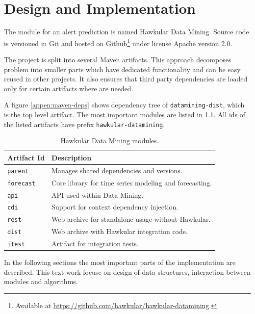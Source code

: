 \chapter{Design and Implementation} \label{chap:design-im[pl}
The module for an alert prediction is named Hawkular Data Mining. Source code is versioned in Git and
hosted on Github\footnote{Available at \url{https://github.com/hawkular/hawkular-datamining}.} under
license Apache version 2.0.

The project is split into several Maven artifacts. This approach decomposes problem into smaller parts
which have dedicated functionality and can be easy reused in other projects. It also ensures that
third party dependencies are loaded only for certain artifacts where are needed.

A figure \ref{appen:maven-deps} shows dependency tree of \texttt{datamining-dist}, which is the top level artifact.
The most important modules are listed in \ref{tab:datamining-modules}. All ids of the listed artifacts have prefix
\texttt{hawkular-datamining}.

\begin{table}[h]
    \begin{center}
        \begin{tabular}{l|l}
            \textbf{Artifact Id} & \textbf{Description} \\ \hline \hline
            \texttt{parent} & Manages shared dependencies and versions. \\
            \texttt{forecast} & Core library for time series modeling and forecasting. \\
            \texttt{api} & API used within Data Mining. \\
            \texttt{cdi} & Support for context dependency injection. \\
            \texttt{rest} & Web archive for standalone usage without Hawkular. \\
            \texttt{dist} & Web archive with Hawkular integration code. \\
            \texttt{itest} & Artifact for integration tests.
        \end{tabular}
        \caption{Hawkular Data Mining modules.}
        \label{tab:datamining-modules}
    \end{center}
\end{table}

In the following sections the most important parts of the implementation are described. This text work focuse on
design of data structures, interaction between modules and algorithms.

